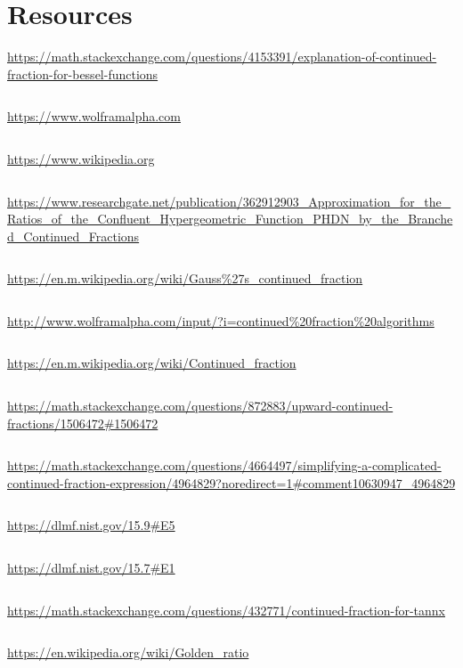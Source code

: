 \documentclass{article}
\begin{document}
\section{Resources}

\url{https://math.stackexchange.com/questions/4153391/explanation-of-continued-fraction-for-bessel-functions}

$${}$$

\url{https://www.wolframalpha.com}

$${}$$

\url{https://www.wikipedia.org}

$${}$$

\url{https://www.researchgate.net/publication/362912903_Approximation_for_the_Ratios_of_the_Confluent_Hypergeometric_Function_PHDN_by_the_Branched_Continued_Fractions}

$${}$$

\url{https://en.m.wikipedia.org/wiki/Gauss%27s_continued_fraction}

$${}$$

\url{http://www.wolframalpha.com/input/?i=continued%20fraction%20algorithms}

$${}$$

\url{https://en.m.wikipedia.org/wiki/Continued_fraction}

$${}$$

\url{https://math.stackexchange.com/questions/872883/upward-continued-fractions/1506472#1506472}

$${}$$

\url{https://math.stackexchange.com/questions/4664497/simplifying-a-complicated-continued-fraction-expression/4964829?noredirect=1#comment10630947_4964829}

$${}$$

\url{https://dlmf.nist.gov/15.9#E5}

$${}$$

\url{https://dlmf.nist.gov/15.7#E1}

$${}$$

\url{https://math.stackexchange.com/questions/432771/continued-fraction-for-tannx}

$${}$$

\url{https://en.wikipedia.org/wiki/Golden_ratio}
\end{document}
